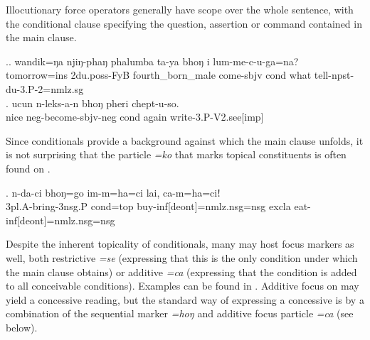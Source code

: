 			
Illocutionary force operators generally have scope over the whole sentence, with the conditional clause specifying the question, assertion or command contained in the main clause. 

\ex.\ag. wandik=ŋa njiŋ-phaŋ  phalumba ta-ya  bhoŋ i    lum-me-c-u-ga=na?\\
tomorrow{\sc =ins} {\sc 2du.poss-}FyB fourth\_born\_male come{\sc [3sg]-sbjv} {\sc cond} what tell{\sc -npst-du-3.P-2=nmlz.sg}\\
 
\bg. ucun n-leks-a-n bhoŋ pheri chept-u-so.\\
nice {\sc neg-}become{\sc -sbjv-neg} {\sc cond} again write{\sc -3.P-V2.see[imp]}\\


Since conditionals provide a background against which the main clause unfolds, it is not surprising that the particle \emph{=ko} that marks topical constituents is often found on  \Next.

\exg. n-da-ci      bhoŋ=go     im-m=ha=ci   lai,  ca-m=ha=ciǃ\\
{\sc 3pl.A-}bring{\sc -3nsg.P} {\sc cond=top} buy{\sc -inf[deont]=nmlz.nsg=nsg}  {\sc excla} eat{\sc -inf[deont]=nmlz.nsg=nsg}\\
 

Despite  the inherent topicality of conditionals, many  may host focus markers as well, both restrictive \emph{=se} (expressing that this is the only condition under which the main clause obtains) or additive \emph{=ca} (expressing that the condition is added to all conceivable conditions). Examples can be found in \Next. Additive focus on  may yield a concessive reading, but the standard way of expressing  a concessive is by a combination of the sequential marker \emph{=hoŋ} and additive focus particle \emph{=ca} (see  below).

